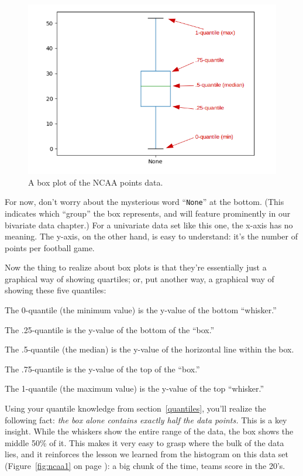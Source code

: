 \begin{figure}[ht]
\centering
\includegraphics[width=1\textwidth]{ncaaboxAnnotated.png}
\caption{A box plot of the NCAA points data.}
\label{fig:ncaaBox}
\end{figure}

For now, don't worry about the mysterious word ``\texttt{None}'' at the bottom.
(This indicates which ``group'' the box represents, and will feature
prominently in our bivariate data chapter.) For a univariate data set like this
one, the x-axis has no meaning. The y-axis, on the other hand, is easy to
understand: it's the number of points per football game.


Now the thing to realize about box plots is that they're essentially just a
graphical way of showing quartiles; or, put another way, a graphical way of
showing these five quantiles:

\begin{compactitem}
\item The 0-quantile (the minimum value) is the y-value of the bottom ``whisker.''
\item The .25-quantile is the y-value of the bottom of the ``box.''
\item The .5-quantile (the median) is the y-value of the horizontal line within
the box.
\item The .75-quantile is the y-value of the top of the ``box.''
\item The 1-quantile (the maximum value) is the y-value of the top ``whisker.''
\end{compactitem}

Using your quantile knowledge from section~\ref{quantiles}, you'll realize the
following fact: \textit{the box alone contains exactly half the data points.}
This is a key insight. While the whiskers show the entire range of the data,
the box shows the middle 50\% of it. This makes it very easy to grasp where the
bulk of the data lies, and it reinforces the lesson we learned from the
histogram on this data set (Figure~\ref{fig:ncaa1} on page
\pageref{fig:ncaa1}): a big chunk of the time, teams score in the 20's.

